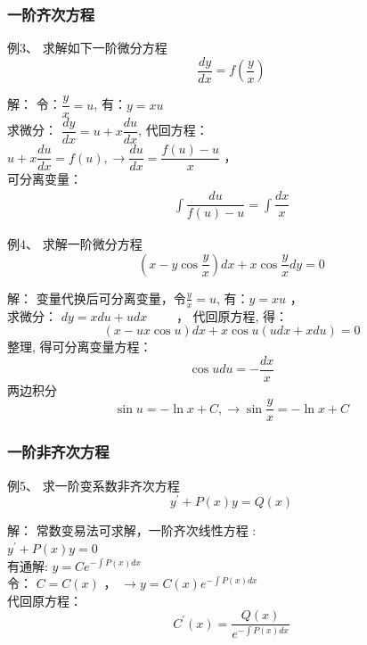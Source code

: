 \begin{frame}
	\frametitle{一阶齐次方程 }
	\begin{exampleblock} {例3、	求解如下一阶微分方程}
	\begin{equation*}
		\frac{d y}{d x}=f\left(\frac{y}{x}\right) 
	\end{equation*}
	\end{exampleblock} 	
	\alert{解：} 令：$\dfrac{y}{x}=u$, 有：$y=xu$ \\ 
	求微分： $ \dfrac{d y}{d x}=u+x \dfrac{d u}{d x}$,	代回方程：\\	
	 $ u+x \dfrac{d u}{d x}=f(u) , \to \dfrac{d u}{d x}=\dfrac{f(u)-u}{x}$ ，\\ \vspace{0.2cm}
	可分离变量：
	\begin{align*}
		\int \dfrac{d u}{f(u)-u}=\int \dfrac{d x}{x} 
	\end{align*}	
\end{frame}

\begin{frame}
\begin{exampleblock} {例4、	求解一阶微分方程}
	\begin{equation*}
	\left(x-y \cos \frac{y}{x}\right) d x+x \cos \frac{y}{x} d y=0
	\end{equation*}
\end{exampleblock} 	
\alert{解：} 变量代换后可分离变量，令$\frac{y}{x}=u$, 有：$y=xu$ ， \\ 
		求微分：	$d y=x d u+u d x$ ~~~~， 
		代回原方程, 得：
		\begin{equation*}
			(x-u x \cos u) d x+x \cos u(u d x+x d u)=0
		\end{equation*}	
		整理, 得可分离变量方程：
		\begin{equation*}
			\cos udu=-\frac{dx}{x}
		\end{equation*}	
		两边积分
		\begin{equation*}
			\sin u=-\ln x+C, \to  \sin \frac{y}{x}=-\ln x+C
		\end{equation*}	
\end{frame}


\begin{frame}
	\frametitle{一阶非齐次方程}
	\begin{exampleblock} {例5、	求一阶变系数非齐次方程}
	\begin{equation*}
		y^{\prime}+P(x) y=Q(x)
	\end{equation*}
	\end{exampleblock} 
	\alert{解：}  常数变易法可求解，一阶齐次线性方程 :\\
		$ y^{\prime}+P(x) y=0$  \\ 
	有通解:	{\large 	$y=Ce^{-\int P(x)dx}$}\\	\vspace{0.3cm}
		令： $C=C(x)$ ，	{\large 	$ \to y=C(x)e^{-\int P(x)dx}$} \\ 
		代回原方程：
		\begin{equation*}
			C^{\prime}(x)=\frac {Q(x)} {e^{-\int P(x)dx}}
		\end{equation*}	
\end{frame}

